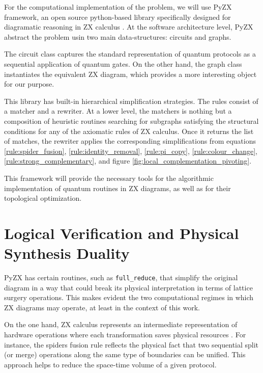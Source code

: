 \documentclass[12pt, twoside, openany]{book}
\begin{document}
For the computational implementation of the problem, we will use PyZX framework, an open source python-based library specifically designed for diagramatic reasoning in ZX calculus \cite{Kissinger_2020}. At the software architecture level, PyZX abstract the problem usin two main data-structures: circuits and graphs. 

The circuit class captures the standard representation of quantum protocols as a sequential application of quantum gates. On the other hand, the graph class instantiates the equivalent ZX diagram, which provides a more interesting object for our purpose. 

This library has built-in hierarchical simplification strategies. The rules consist of a matcher and a rewriter. At a lower level, the matchers is nothing but a composition of heuristic routines searching for subgraphs satisfying the structural conditions for any of the axiomatic rules of ZX calculus. Once it returns the list of matches, the rewriter applies the corresponding simplifications from equations \ref{rule:spider_fusion}, \ref{rule:identity_removal}, \ref{rule:pi_copy}, \ref{rule:colour_change}, \ref{rule:strong_complementary}, and figure \ref{fig:local_complementation_pivoting}.

This framework will provide the necessary tools for the algorithmic implementation of quantum routines in ZX diagrams, as well as for their topological optimization. \\

\section{Logical Verification and Physical Synthesis Duality}

PyZX has certain routines, such as \texttt{full\_reduce}, that simplify the original diagram in a way that could break its physical interpretation in terms of lattice surgery operations. This makes evident the two computational regimes in which ZX diagrams may operate, at least in the context of this work. 

On the one hand, ZX calculus represents an intermediate representation of hardware operations where each transformation saves physical resources \cite{zhou2026topolslatticesurgerycompilation}. For instance, the spiders fusion rule reflects the physical fact that two sequential split (or merge) operations along the same type of boundaries can be unified. This approach helps to reduce the space-time volume of a given protocol. 
\end{document}
